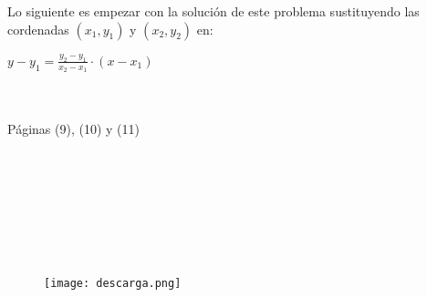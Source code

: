 \documentclass[12pt]{article}
\begin{document}
Lo siguiente es empezar con la solución de este problema sustituyendo las cordenadas $(x_1,y_1)$ y $(x_2,y_2)$ en:

\begin{center}
 $y-y_1=\frac{y_2-y_1}{x_2-x_1}\cdot (x-x_1)$ 
\end{center}

{} \\ \\

Páginas (9), (10) y (11)  \\ \\  \\ \\  \\ \\  \\ \\

\begin{figure}[htb] \centering \texttt{[image: descarga.png]} \end{figure}
\end{document}
